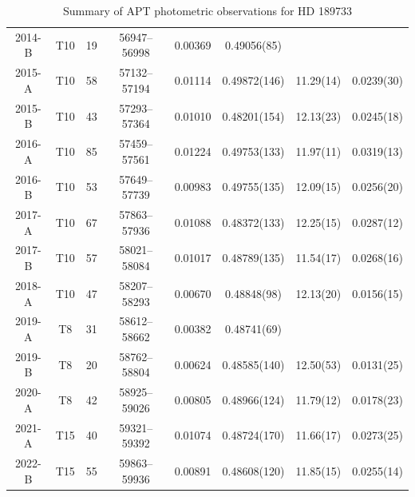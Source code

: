 \documentclass[sn-standardnature]{sn-jnl}%
\begin{document}
\begin{table}
\begin{tabular}{@{}cccccccc@{}}
   2014-B  & T10 &  19 & 56947--56998 & 0.00369 & 0.49056(85)  &    &     \\
   2015-A  & T10 &  58 & 57132--57194 & 0.01114 & 0.49872(146) & 11.29(14) & 0.0239(30) \\
   2015-B  & T10 &  43 & 57293--57364 & 0.01010 & 0.48201(154) & 12.13(23) & 0.0245(18) \\
   2016-A  & T10 &  85 & 57459--57561 & 0.01224 & 0.49753(133) & 11.97(11) & 0.0319(13) \\
   2016-B  & T10 &  53 & 57649--57739 & 0.00983 & 0.49755(135) & 12.09(15) & 0.0256(20) \\
   2017-A  & T10 &  67 & 57863--57936 & 0.01088 & 0.48372(133) & 12.25(15) & 0.0287(12) \\
   2017-B  & T10 &  57 & 58021--58084 & 0.01017 & 0.48789(135) & 11.54(17) & 0.0268(16) \\
   2018-A  & T10 &  47 & 58207--58293 & 0.00670 & 0.48848(98)  & 12.13(20) & 0.0156(15) \\
   2019-A  & T8  &  31 & 58612--58662 & 0.00382 & 0.48741(69)  &    &    \\
   2019-B  & T8  &  20 & 58762--58804 & 0.00624 & 0.48585(140) & 12.50(53) & 0.0131(25) \\
   2020-A  & T8  &  42 & 58925--59026 & 0.00805 & 0.48966(124) & 11.79(12) & 0.0178(23) \\
   2021-A  & T15 &  40 & 59321--59392 & 0.01074 & 0.48724(170) & 11.66(17) & 0.0273(25) \\
   2022-B  & T15 &  55 & 59863--59936 & 0.00891 & 0.48608(120) & 11.85(15) & 0.0255(14) \\
\hline
\end{tabular}
\caption{Summary of APT photometric observations for HD 189733}
\label{SI-APT}
\end{table}
\end{document}
